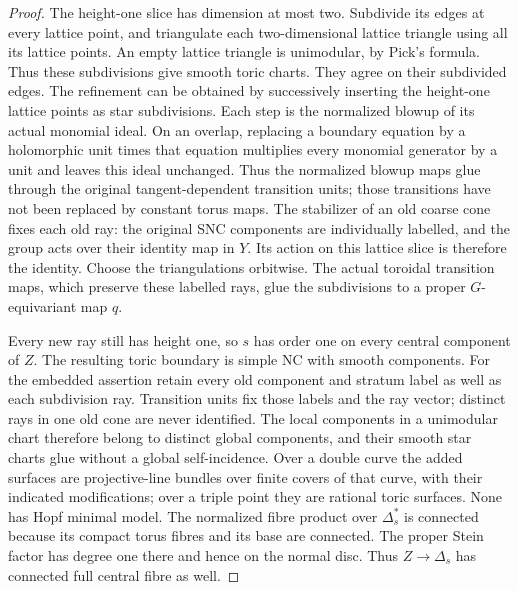 \begin{proof}
The height-one slice has dimension at most
two. Subdivide its edges at every lattice
point, and triangulate each two-dimensional
lattice triangle using all its lattice
points. An empty lattice triangle is
unimodular, by Pick's formula. Thus these
subdivisions give smooth toric charts.
They agree on their subdivided edges.
The refinement can be obtained by
successively inserting the height-one
lattice points as star subdivisions.
Each step is the normalized blowup
of its actual monomial ideal. On an
overlap, replacing a boundary equation
by a holomorphic unit times that
equation multiplies every monomial
generator by a unit and leaves this
ideal unchanged. Thus the normalized
blowup maps glue through the original
tangent-dependent transition units;
those transitions have not been
replaced by constant torus maps.
The stabilizer of an old coarse cone fixes
each old ray: the original SNC components
are individually labelled, and the group
acts over their identity map in $Y$.
Its action on this lattice slice is
therefore the identity. Choose the
triangulations orbitwise. The actual
toroidal transition maps, which preserve
these labelled rays, glue the subdivisions
to a proper $G$-equivariant map $q$.

Every new ray still has height one,
so $s$ has order one on every central
component of $Z$. The resulting toric
boundary is simple NC with smooth
components. For the embedded assertion
retain every old component and stratum
label as well as each subdivision ray.
Transition units fix those labels and
the ray vector; distinct rays in one
old cone are never identified. The
local components in a unimodular
chart therefore belong to distinct
global components, and their smooth
star charts glue without a global
self-incidence. Over a double curve the
added surfaces are projective-line
bundles over finite covers of that
curve, with their indicated modifications;
over a triple point they are rational
toric surfaces. None has Hopf minimal
model. The normalized fibre product
over $\Delta_s^*$ is connected because
its compact torus fibres and its base
are connected. The proper Stein factor
has degree one there and hence on the
normal disc. Thus $Z\to\Delta_s$ has
connected full central fibre as well.


\end{proof}
